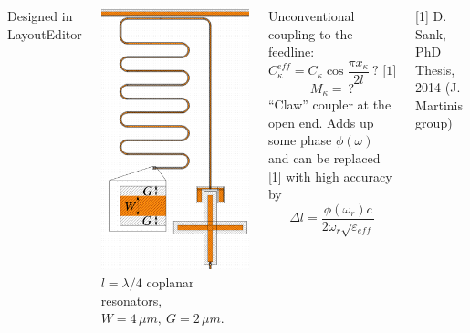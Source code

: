 \documentclass[aspectratio=169, 13pt, t]{beamer}
\begin{document}
\begin{frame}[c]\frametitle{\secname}\framesubtitle{\subsecname}
\begin{columns}[c]
{\footnotesize Designed in LayoutEditor}

\includegraphics[height=0.85\textheight]{xmonres}
$l = \lambda/4$ coplanar resonators, $W=4\,\mu m,\ G=2\,\mu m$.

\vspace{0.5cm}
Unconventional coupling to the feedline:
 $$C_\kappa^{eff} = C_\kappa \cos \frac{\pi x_\kappa}{2 l}\ ? \text{ [1]}$$
 $$M_\kappa =\ ?$$
``Claw'' coupler at the open end. Adds up some phase $\phi(\omega)$ and can be replaced [1] with high accuracy by
$$\Delta l = \frac{\phi(\omega_r) c}{2 \omega_r \sqrt{\varepsilon_{eff}}}$$


{\footnotesize[1] D. Sank, PhD Thesis, 2014 (J. Martinis group)}
\end{columns}
\end{frame}
\end{document}
